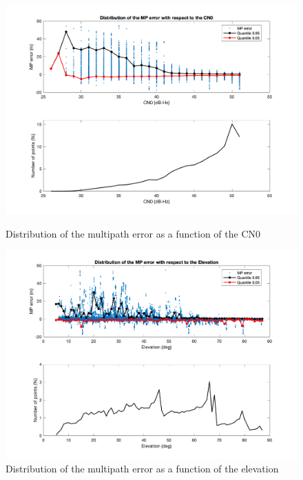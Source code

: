 \documentclass[a4paper, report, oneside, UKenglish]{memoir}
\begin{document}
\begin{figure}[htb]
  \centering
  \begin{minipage}[b]{0.49\textwidth}
    \includegraphics[width=\textwidth]{data-analysis/mpn_cn0.png}
    \caption{Distribution of the multipath error as a function of the CN0}
    \label{fig:mpn_cn0}
  \end{minipage}
  \hfill
  \begin{minipage}[b]{0.49\textwidth}
    \includegraphics[width=\textwidth]{data-analysis/mpn_elev.png}
    \caption{Distribution of the multipath error as a function of the elevation}
    \label{fig:mpn_elev}
  \end{minipage}
\end{figure}
\end{document}
